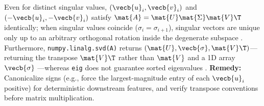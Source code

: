\documentclass[../../../../master.tex]{subfiles}
\begin{document}
\begin{pitfall}
Even for distinct singular values, $(\vecb{u}_i, \vecb{v}_i)$ and $(-\vecb{u}_i, -\vecb{v}_i)$ satisfy $\mat{A} = \mat{U}\mat{\Sigma}\mat{V}\T$ identically; when singular values coincide ($\sigma_i = \sigma_{i+1}$), singular vectors are unique only up to an arbitrary orthogonal rotation inside the degenerate subspace  . Furthermore, \texttt{numpy.linalg.svd(A)} returns $(\mat{U}, \vecb{\sigma}, \mat{V}\T)$---returning the transpose $\mat{V}\T$ rather than $\mat{V}$ and a 1D array $\vecb{\sigma}$ ---whereas \texttt{eig} does not guarantee sorted eigenvalues . \textbf{Remedy:} Canonicalize signs (e.g., force the largest-magnitude entry of each $\vecb{u}_i$ positive) for deterministic downstream features, and verify transpose conventions before matrix multiplication.
\end{pitfall}
\end{document}
